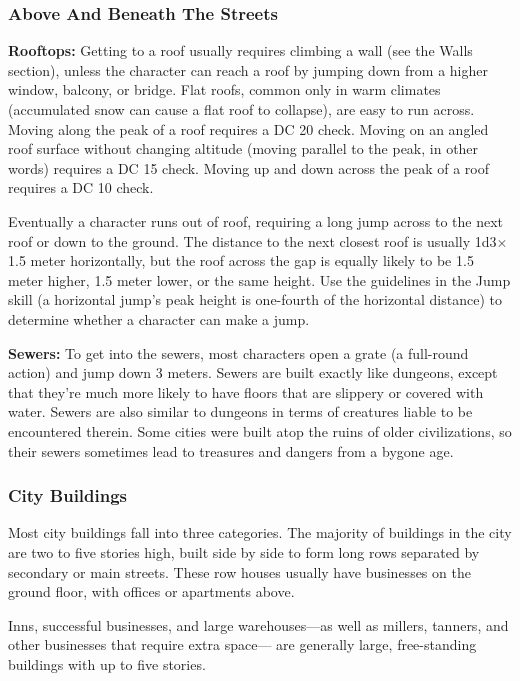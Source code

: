 \subsubsection{Above And Beneath The Streets}
\textbf{Rooftops:} Getting to a roof usually requires climbing a wall (see the Walls section), unless the character can reach a roof by jumping down from a higher window, balcony, or bridge. Flat roofs, common only in warm climates (accumulated snow can cause a flat roof to collapse), are easy to run across. Moving along the peak of a roof requires a DC 20  check. Moving on an angled roof surface without changing altitude (moving parallel to the peak, in other words) requires a DC 15  check. Moving up and down across the peak of a roof requires a DC 10  check.

Eventually a character runs out of roof, requiring a long jump across to the next roof or down to the ground. The distance to the next closest roof is usually 1d3$\times$1.5 meter horizontally, but the roof across the gap is equally likely to be 1.5 meter higher, 1.5 meter lower, or the same height. Use the guidelines in the Jump skill (a horizontal jump's peak height is one-fourth of the horizontal distance) to determine whether a character can make a jump.

\textbf{Sewers:} To get into the sewers, most characters open a grate (a full-round action) and jump down 3 meters. Sewers are built exactly like dungeons, except that they're much more likely to have floors that are slippery or covered with water. Sewers are also similar to dungeons in terms of creatures liable to be encountered therein. Some cities were built atop the ruins of older civilizations, so their sewers sometimes lead to treasures and dangers from a bygone age.

\subsubsection{City Buildings}
Most city buildings fall into three categories. The majority of buildings in the city are two to five stories high, built side by side to form long rows separated by secondary or main streets. These row houses usually have businesses on the ground floor, with offices or apartments above.

Inns, successful businesses, and large warehouses---as well as millers, tanners, and other businesses that require extra space--- are generally large, free-standing buildings with up to five stories.

